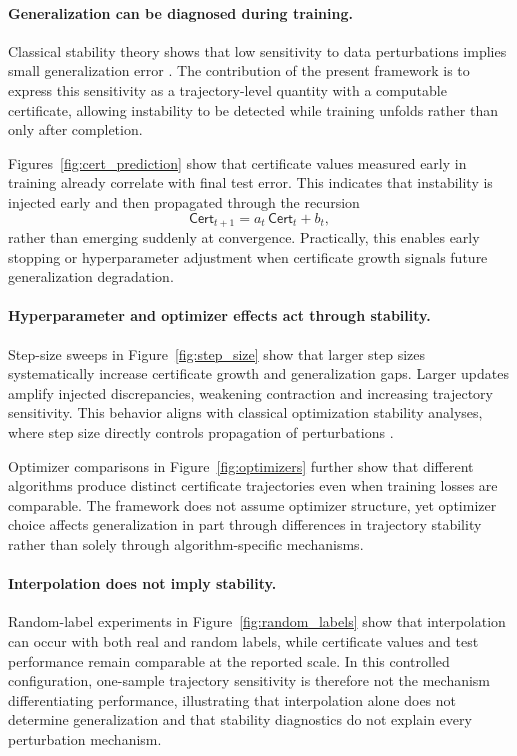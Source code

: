 \documentclass{article}
\numberwithin{equation}{section}
\begin{document}
\paragraph{Generalization can be diagnosed during training.}
Classical stability theory shows that low sensitivity to data perturbations implies small generalization error \cite{bousquet2002stability}. The contribution of the present framework is to express this sensitivity as a trajectory-level quantity with a computable certificate, allowing instability to be detected while training unfolds rather than only after completion.

Figures~\ref{fig:cert_prediction} show that certificate values measured early in training already correlate with final test error. This indicates that instability is injected early and then propagated through the recursion
\[
\mathsf{Cert}_{t+1}=a_t\,\mathsf{Cert}_t + b_t,
\]
rather than emerging suddenly at convergence. Practically, this enables early stopping or hyperparameter adjustment when certificate growth signals future generalization degradation.

\paragraph{Hyperparameter and optimizer effects act through stability.}
Step-size sweeps in Figure~\ref{fig:step_size} show that larger step sizes systematically increase certificate growth and generalization gaps. Larger updates amplify injected discrepancies, weakening contraction and increasing trajectory sensitivity. This behavior aligns with classical optimization stability analyses, where step size directly controls propagation of perturbations \cite{pmlr-v48-hardt16}.

Optimizer comparisons in Figure~\ref{fig:optimizers} further show that different algorithms produce distinct certificate trajectories even when training losses are comparable. The framework does not assume optimizer structure, yet optimizer choice affects generalization in part through differences in trajectory stability rather than solely through algorithm-specific mechanisms.

\paragraph{Interpolation does not imply stability.}
Random-label experiments in Figure~\ref{fig:random_labels} show that interpolation can occur with both real and random labels, while certificate values and test performance remain comparable at the reported scale. In this controlled configuration, one-sample trajectory sensitivity is therefore not the mechanism differentiating performance, illustrating that interpolation alone does not determine generalization and that stability diagnostics do not explain every perturbation mechanism.
\end{document}
